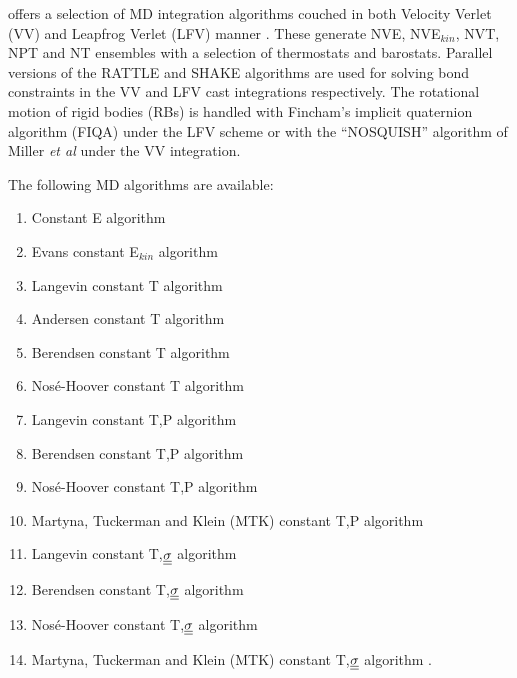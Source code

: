 \D offers a selection of MD integration algorithms
couched in both Velocity Verlet (VV) and Leapfrog Verlet (LFV)
manner   \cite{allen-89a}.
These generate NVE, NVE$_{kin}$, NVT, NPT and N\mat{\sigma}T
ensembles with a selection of
thermostats and barostats.
Parallel versions of the RATTLE
\cite{andersen-83a} and SHAKE
\cite{smith-94b} algorithms are used for solving bond
constraints in the VV and LFV cast
integrations respectively.  The rotational motion of
rigid bodies (RBs) is handled with Fincham's
implicit quaternion algorithm
(FIQA) \cite{fincham-92a} under the LFV scheme or with the
``NOSQUISH'' algorithm of Miller {\em et al} 
\cite{miller-02a} under the VV integration.

The following MD algorithms are available:
\begin{enumerate}
\item Constant E algorithm
\item Evans constant E$_{kin}$ algorithm \cite{evans-84a}
\item Langevin constant T algorithm \cite{adelman-76a}
\item Andersen constant T algorithm \cite{andersen-79a}
\item Berendsen constant T algorithm \cite{berendsen-84a}
\item Nos\'{e}-Hoover constant T algorithm \cite{hoover-85a}
\item Langevin constant T,P algorithm \cite{quigley-04a}
\item Berendsen constant T,P algorithm \cite{berendsen-84a}
\item Nos\'{e}-Hoover constant T,P algorithm \cite{hoover-85a}
\item Martyna, Tuckerman and Klein (MTK) constant T,P algorithm \cite{martyna-96a}
\item Langevin constant T,$\mbox{$\underline{\underline{\bf \sigma}}$}$ algorithm \cite{quigley-04a}
\item Berendsen constant T,$\mbox{$\underline{\underline{\bf \sigma}}$}$ algorithm \cite{berendsen-84a}
\item Nos\'{e}-Hoover constant T,$\mbox{$\underline{\underline{\bf \sigma}}$}$ algorithm \cite{hoover-85a}
\item Martyna, Tuckerman and Klein (MTK) constant T,$\mbox{$\underline{\underline{\bf \sigma}}$}$ algorithm \cite{martyna-96a}.
\end{enumerate}

